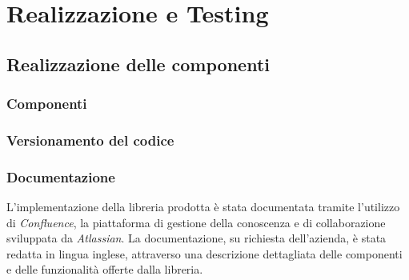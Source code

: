 \chapter{Realizzazione e Testing}
\label{chap:realizzazione-testing}

\section{Realizzazione delle componenti}
\subsection{Componenti}

\subsection{Versionamento del codice}

\subsection{Documentazione}
L'implementazione della libreria prodotta è stata documentata tramite l'utilizzo di \textit{Confluence}, la piattaforma
di gestione della conoscenza e di collaborazione sviluppata da \textit{Atlassian}. \newline
La documentazione, su richiesta dell'azienda, è stata redatta in lingua inglese, attraverso una descrizione dettagliata
delle componenti e delle funzionalità offerte dalla libreria. \newline

